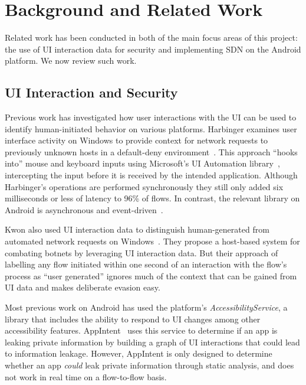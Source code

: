 \section{Background and Related Work}
\label{sec:related-work}

Related work has been conducted in both of the main focus areas of this project:
the use of UI interaction data for security and implementing SDN on the Android
platform. We now review such work.

\subsection{UI Interaction and Security}
\label{sec:ui-interaction-and-security}

Previous work has investigated how user interactions with the UI can be used to
identify human-initiated behavior on various platforms. Harbinger examines user
interface activity on Windows to provide context for network requests to
previously unknown hosts in a default-deny environment~\cite{chuluundorj2019}.
This approach ``hooks into'' mouse and keyboard inputs using Microsoft's UI
Automation library~\cite{microsoft2018}, intercepting the input before it is
received by the intended application. Although Harbinger's operations are
performed synchronously they still only added six milliseconds or less of
latency to 96\% of flows. In contrast, the relevant library on Android is
asynchronous and event-driven~\cite{googledevelopers2020}.

Kwon \etal also used UI interaction data to distinguish human-generated from
automated network requests on Windows~\cite{kwon2011}. They propose a host-based
system for combating botnets by leveraging UI interaction data. But their
approach of labelling any flow initiated within one second of an interaction
with the flow's process as ``user generated'' ignores much of the context that
can be gained from UI data and makes deliberate evasion easy.

Most previous work on Android has used the platform's
\textit{AccessibilityService}, a library that includes the ability to respond to
UI changes among other accessibility features. AppIntent~\cite{yang2013} uses
this service to determine if an app is leaking private information by building a
graph of UI interactions that could lead to information leakage. However,
AppIntent is only designed to determine whether an app \textit{could} leak
private information through static analysis, and does not work in real time on a
flow-to-flow basis.


